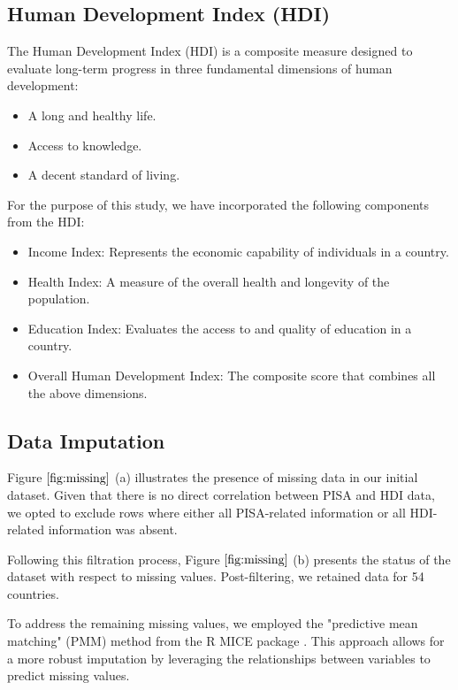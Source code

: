 \documentclass[12pt]{article}
\begin{document}
\subsection{Human Development Index (HDI)}

The Human Development Index (HDI) is a composite measure designed to evaluate long-term progress in three fundamental dimensions of human development:
\begin{itemize}
\item A long and healthy life.
\item Access to knowledge.
\item A decent standard of living.
\end{itemize}

For the purpose of this study, we have incorporated the following components from the HDI:
\begin{itemize}
\item Income Index: Represents the economic capability of individuals in a country.
\item Health Index: A measure of the overall health and longevity of the population.
\item Education Index: Evaluates the access to and quality of education in a country.
\item Overall Human Development Index: The composite score that combines all the above dimensions.
\end{itemize}


\subsection{Data Imputation}
\label{ss.imputation}

Figure $\ref{fig:missing}$ (a) illustrates the presence of missing data in our initial dataset. Given that there is no direct correlation between PISA and HDI data, we opted to exclude rows where either all PISA-related information or all HDI-related information was absent.

Following this filtration process, Figure $\ref{fig:missing}$ (b) presents the status of the dataset with respect to missing values. Post-filtering, we retained data for 54 countries.

To address the remaining missing values, we employed the "predictive mean matching" (PMM) method from the R MICE package \cite{mice_package}. This approach allows for a more robust imputation by leveraging the relationships between variables to predict missing values.
\end{document}
